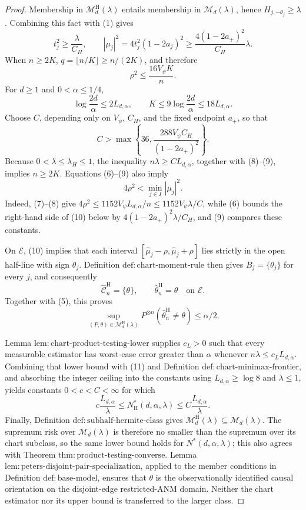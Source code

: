 \documentclass{article}
\begin{document}
\begin{proof}
Membership in \(\mathcal M_d^{\mathrm H}(\lambda)\) entails membership in \(\mathcal M_d(\lambda)\), hence \(H_{j,-\theta_j}\ge\lambda\).  Combining this fact with (1) gives
\[
t_j^2\ge\frac{\lambda}{C_H},
\qquad
|\mu_j|^2=4t_j^2(1-2a_j)^2
\ge \frac{4(1-2a_+)^2}{C_H}\lambda.
\tag{6}
\]
When \(n\ge2K\), \(q=\lfloor n/K\rfloor\ge n/(2K)\), and therefore
\[
\rho^2\le\frac{16V_\psi K}{n}.
\tag{7}
\]
For \(d\ge1\) and \(0<\alpha\le1/4\),
\[
\log\frac{2d}{\alpha}\le2L_{d,\alpha},
\qquad
K\le9\log\frac{2d}{\alpha}\le18L_{d,\alpha}.
\tag{8}
\]
Choose \(C\), depending only on \(V_\psi\), \(C_H\), and the fixed endpoint \(a_+\), so that
\[
C>\max\left\{36,\frac{288V_\psi C_H}{(1-2a_+)^2}\right\}.
\tag{9}
\]
Because \(0<\lambda\le\lambda_H\le1\), the inequality \(n\lambda\ge CL_{d,\alpha}\), together with (8)--(9), implies \(n\ge2K\).  Equations (6)--(9) also imply
\[
4\rho^2<\min_{j\in I}|\mu_j|^2.
\tag{10}
\]
Indeed, (7)--(8) give \(4\rho^2\le1152V_\psi L_{d,\alpha}/n\le1152V_\psi\lambda/C\), while (6) bounds the right-hand side of (10) below by \(4(1-2a_+)^2\lambda/C_H\), and (9) compares these constants.

On \(\mathcal E\), (10) implies that each interval \([\widehat\mu_j-\rho,\widehat\mu_j+\rho]\) lies strictly in the open half-line with sign \(\theta_j\).  Definition \(\mathrm{def:chart\text{-}moment\text{-}rule}\) then gives \(B_j=\{\theta_j\}\) for every \(j\), and consequently
\[
\widehat{\mathcal C}_n^{\mathrm H}=\{\theta\},
\qquad
\widehat\theta_n^{\mathrm H}=\theta
\quad\text{on }\mathcal E.
\]
Together with (5), this proves
\[
\sup_{(P,\theta)\in\mathcal M_d^{\mathrm H}(\lambda)}
P^{\otimes n}(\widehat\theta_n^{\mathrm H}\ne\theta)
\le\alpha/2.
\tag{11}
\]

Lemma \(\mathrm{lem:chart\text{-}product\text{-}testing\text{-}lower}\) supplies \(c_L>0\) such that every measurable estimator has worst-case error greater than \(\alpha\) whenever \(n\lambda\le c_LL_{d,\alpha}\).  Combining that lower bound with (11) and Definition \(\mathrm{def:chart\text{-}minimax\text{-}frontier}\), and absorbing the integer ceiling into the constants using \(L_{d,\alpha}\ge\log8\) and \(\lambda\le1\), yields constants \(0<c<C<\infty\) for which
\[
c\frac{L_{d,\alpha}}{\lambda}
\le N_{\mathrm H}^*(d,\alpha,\lambda)
\le C\frac{L_{d,\alpha}}{\lambda}.
\]
Finally, Definition \(\mathrm{def:subhalf\text{-}hermite\text{-}class}\) gives \(\mathcal M_d^{\mathrm H}(\lambda)\subseteq\mathcal M_d(\lambda)\).  The supremum risk over \(\mathcal M_d(\lambda)\) is therefore no smaller than the supremum over its chart subclass, so the same lower bound holds for \(N^*(d,\alpha,\lambda)\); this also agrees with Theorem \(\mathrm{thm:product\text{-}testing\text{-}converse}\).  Lemma \(\mathrm{lem:peters\text{-}disjoint\text{-}pair\text{-}specialization}\), applied to the member conditions in Definition \(\mathrm{def:base\text{-}model}\), ensures that \(\theta\) is the observationally identified causal orientation on the disjoint-edge restricted-ANM domain.  Neither the chart estimator nor its upper bound is transferred to the larger class.
\end{proof}
\end{document}
